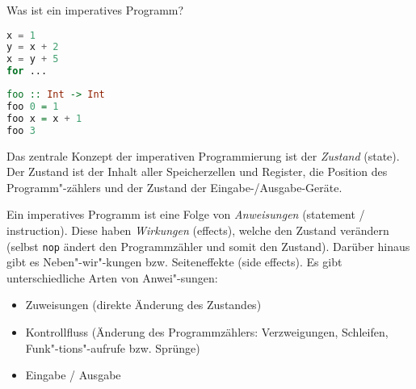 \begin{question}[folgend]
    Was ist ein imperatives Programm?
\end{question}



\begin{lstlisting}[language=Python, caption=Imperatives Programm]
x = 1
y = x + 2
x = y + 5
for ...
\end{lstlisting}


\begin{lstlisting}[language=Haskell, caption=Funktionales Programm]
foo :: Int -> Int
foo 0 = 1
foo x = x + 1
foo 3
\end{lstlisting}

Das zentrale Konzept der imperativen Programmierung ist der \emph{Zustand} (state). Der Zustand ist der Inhalt aller Speicherzellen und Register, die Position des Programm"-zählers und der Zustand der Eingabe-/Ausgabe-Geräte.

Ein imperatives Programm ist eine Folge von \emph{Anweisungen} (statement / instruction). Diese haben \emph{Wirkungen} (effects), welche den Zustand verändern (selbst \texttt{nop} ändert den Programmzähler und somit den Zustand). Darüber hinaus gibt es Neben"-wir"-kungen bzw. Seiteneffekte (side effects). Es gibt unterschiedliche Arten von Anwei"-sungen:
\begin{itemize}
    \item Zuweisungen (direkte Änderung des Zustandes)
    \item Kontrollfluss (Änderung des Programmzählers: Verzweigungen, Schleifen, Funk"-tions"-aufrufe bzw. Sprünge)
    \item Eingabe / Ausgabe
\end{itemize}

